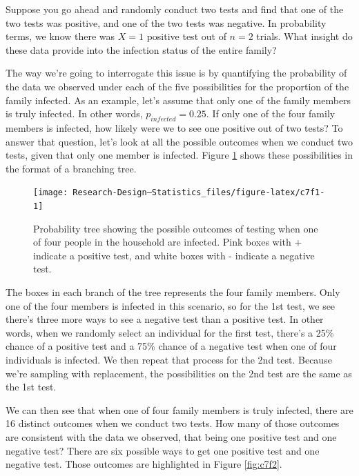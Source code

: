\documentclass[
]{book}
\begin{document}
Suppose you go ahead and randomly conduct two tests and find that one of the two tests was positive, and one of the two tests was negative. In probability terms, we know there was \(X = 1\) positive test out of \(n = 2\) trials. What insight do these data provide into the infection status of the entire family?

The way we're going to interrogate this issue is by quantifying the probability of the data we observed under each of the five possibilities for the proportion of the family infected. As an example, let's assume that only one of the family members is truly infected. In other words, \(p_{infected} = 0.25\). If only one of the four family members is infected, how likely were we to see one positive out of two tests? To answer that question, let's look at all the possible outcomes when we conduct two tests, given that only one member is infected. Figure \ref{fig:c7f1} shows these possibilities in the format of a branching tree.

\begin{figure}

{\centering \texttt{[image: Research-Design---Statistics\_files/figure-latex/c7f1-1]} 

}

\caption{Probability tree showing the possible outcomes of testing when one of four people in the household are infected. Pink boxes with + indicate a positive test, and white boxes with - indicate a negative test.}\label{fig:c7f1}
\end{figure}

The boxes in each branch of the tree represents the four family members. Only one of the four members is infected in this scenario, so for the 1st test, we see there's three more ways to see a negative test than a positive test. In other words, when we randomly select an individual for the first test, there's a 25\% chance of a positive test and a 75\% chance of a negative test when one of four individuals is infected. We then repeat that process for the 2nd test. Because we're sampling with replacement, the possibilities on the 2nd test are the same as the 1st test.

We can then see that when one of four family members is truly infected, there are 16 distinct outcomes when we conduct two tests. How many of those outcomes are consistent with the data we observed, that being one positive test and one negative test? There are six possible ways to get one positive test and one negative test. Those outcomes are highlighted in Figure \ref{fig:c7f2}.
\end{document}
